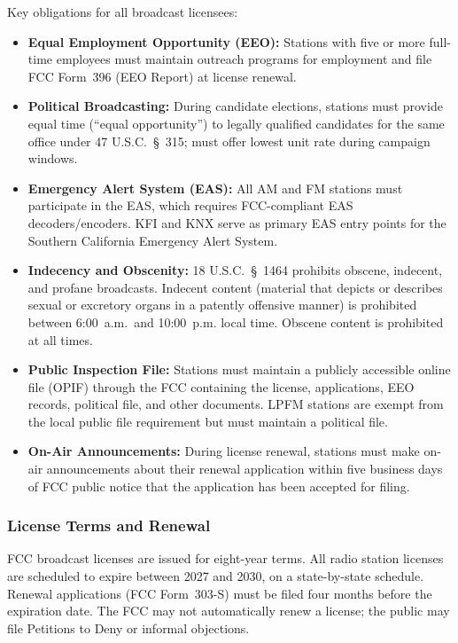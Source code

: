 \documentclass[11pt,letterpaper]{article}
\begin{document}
\begin{asciibox}
Key obligations for all broadcast licensees:
\begin{itemize}[leftmargin=*]
  \item \textbf{Equal Employment Opportunity (EEO):} Stations with five or more full-time employees
        must maintain outreach programs for employment and file FCC Form~396 (EEO Report) at
        license renewal.
  \item \textbf{Political Broadcasting:} During candidate elections, stations must provide equal
        time (``equal opportunity'') to legally qualified candidates for the same office under
        47 U.S.C.~\S~315; must offer lowest unit rate during campaign windows.
  \item \textbf{Emergency Alert System (EAS):} All AM and FM stations must participate in the EAS,
        which requires FCC-compliant EAS decoders/encoders. KFI and KNX serve as primary EAS
        entry points for the Southern California Emergency Alert System.
  \item \textbf{Indecency and Obscenity:} 18 U.S.C.~\S~1464 prohibits obscene, indecent, and
        profane broadcasts. Indecent content (material that depicts or describes sexual or
        excretory organs in a patently offensive manner) is prohibited between 6:00~a.m.\ and
        10:00~p.m. local time. Obscene content is prohibited at all times.
  \item \textbf{Public Inspection File:} Stations must maintain a publicly accessible online
        file (OPIF) through the FCC containing the license, applications, EEO records, political
        file, and other documents. LPFM stations are exempt from the local public file requirement
        but must maintain a political file.
  \item \textbf{On-Air Announcements:} During license renewal, stations must make on-air
        announcements about their renewal application within five business days of FCC public
        notice that the application has been accepted for filing.
\end{itemize}

\subsubsection{License Terms and Renewal}

FCC broadcast licenses are issued for eight-year terms. All radio station licenses are scheduled
to expire between 2027 and 2030, on a state-by-state schedule. Renewal applications (FCC
Form~303-S) must be filed four months before the expiration date. The FCC may not automatically
renew a license; the public may file Petitions to Deny or informal objections.


\end{asciibox}
\end{document}
